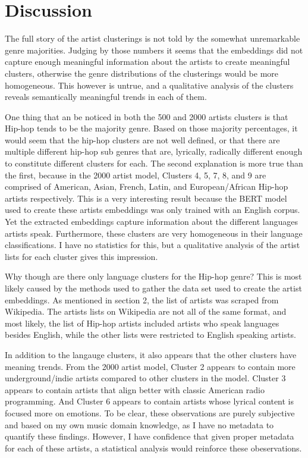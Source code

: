 \documentclass[11pt,a4paper]{article}
\begin{document}
\section{Discussion}
The full story of the artist clusterings is not told by the somewhat unremarkable genre majorities. Judging by those numbers it seems that the embeddings did not capture enough meaningful information about the artists to create meaningful clusters, otherwise the genre distributions of the clusterings would be more homogeneous. This however is untrue, and a qualitative analysis of the clusters reveals semantically meaningful trends in each of them.

One thing that an be noticed in both the 500 and 2000 artists clusters is that Hip-hop tends to be the majority genre. Based on those majority percentages, it would seem that the hip-hop clusters are not well defined, or that there are multiple different hip-hop sub genres that are, lyrically, radically different enough to constitute different clusters for each. The second explanation is more true than the first, because in the 2000 artist model, Clusters 4, 5, 7, 8, and 9 are comprised of American, Asian, French, Latin, and European/African Hip-hop artists respectively. This is a very interesting result because the BERT model used to create these artists embeddings was only trained with an English corpus. Yet the extracted embeddings capture information about the different languages artists speak. Furthermore, these clusters are very homogeneous in their language classifications. I have no statistics for this, but a qualitative analysis of the artist lists for each cluster gives this impression.

Why though are there only language clusters for the Hip-hop genre? This is most likely caused by the methods used to gather the data set used to create the artist embeddings. As mentioned in section 2, the list of artists was scraped from Wikipedia. The artists lists on Wikipedia are not all of the same format, and most likely, the list of Hip-hop artists included artists who speak languages besides English, while the other lists were restricted to English speaking artists.

In addition to the langauge clusters, it also appears that the other clusters have meaning trends. From the 2000 artist model, Cluster 2 appears to contain more underground/indie artists compared to other clusters in the model. Cluster 3 appears to contain artists that align better with classic American radio programming. And Cluster 6 appears to contain artists whose lyrical content is focused more on emotions. To be clear, these observations are purely subjective and based on my own music domain knowledge, as I have no metadata to quantify these findings. However, I have confidence that given proper metadata for each of these artists, a statistical analysis would reinforce these obeservations. 
\end{document}
